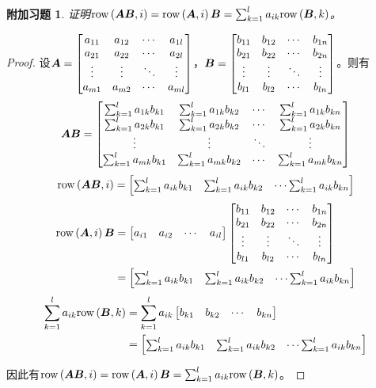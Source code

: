 \documentclass{ctexart}
\newtheorem{extraprob}{附加习题}[section]
\begin{document}
\begin{extraprob}\label{extra-1.1}
    证明\(\row{\mata\matb}{i}=\row{\mata}{i}\matb=\sum_{k=1}^la_{ik}\row{\matb}{k}\)。
\end{extraprob}
\begin{proof}
    设\(\mata=\normmat{bmatrix}{a}{m}{l}\)，\(\matb=\normmat{bmatrix}{b}{l}{n}\)。则有
    \begin{equation*}
        \mata\matb=
        \begin{bmatrix}
            \sum_{k=1}^la_{1k}b_{k1} & \sum_{k=1}^la_{1k}b_{k2} & \cdots & \sum_{k=1}^la_{1k}b_{kn} \\
            \sum_{k=1}^la_{2k}b_{k1} & \sum_{k=1}^la_{2k}b_{k2} & \cdots & \sum_{k=1}^la_{2k}b_{kn} \\
            \vdots                   & \vdots                   & \ddots & \vdots                   \\
            \sum_{k=1}^la_{mk}b_{k1} & \sum_{k=1}^la_{mk}b_{k2} & \cdots & \sum_{k=1}^la_{mk}b_{kn}
        \end{bmatrix}
    \end{equation*}
    \begin{equation*}
        \row{\mata\matb}{i}=
        \begin{bmatrix}
            \sum_{k=1}^la_{ik}b_{k1} & \sum_{k=1}^la_{ik}b_{k2} & \cdots\sum_{k=1}^la_{ik}b_{kn}
        \end{bmatrix}
    \end{equation*}
    \begin{align*}
        \row{\mata}{i}\matb & =
        \begin{bmatrix}
            a_{i1} & a_{i2} & \cdots & a_{il}
        \end{bmatrix}\normmat{bmatrix}{b}{l}{n} \\
                            & =
        \begin{bmatrix}
            \sum_{k=1}^la_{ik}b_{k1} & \sum_{k=1}^la_{ik}b_{k2} & \cdots\sum_{k=1}^la_{ik}b_{kn}
        \end{bmatrix}
    \end{align*}
    \begin{align*}
        \sum_{k=1}^la_{ik}\row{\matb}{k} & =\sum_{k=1}^la_{ik}
        \begin{bmatrix}
            b_{k1} & b_{k2} & \cdots & b_{kn}
        \end{bmatrix}                            \\
                                         & =
        \begin{bmatrix}
            \sum_{k=1}^la_{ik}b_{k1} & \sum_{k=1}^la_{ik}b_{k2} & \cdots\sum_{k=1}^la_{ik}b_{kn}
        \end{bmatrix}
    \end{align*}

    因此有\(\row{\mata\matb}{i}=\row{\mata}{i}\matb=\sum_{k=1}^la_{ik}\row{\matb}{k}\)。
\end{proof}
\end{document}
